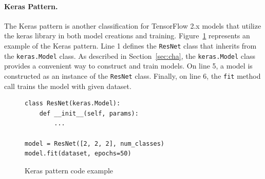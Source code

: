 


\paragraph{Keras Pattern.}
The Keras pattern is another classification for TensorFlow 2.x models that
utilize the keras library in both model creations and training. 
Figure~\ref{fig:keraspattern} represents an example of the Keras pattern.
Line 1 defines the {\tt ResNet} class that inherits from the {\tt keras.Model}
class. 
As described in Section~\ref{sec:cha}, the {\tt keras.Model} class provides a
convenient way to construct and train models. 
On line 5, a model is constructed as an instance of the {\tt ResNet} class.
Finally, on line 6, the {\tt fit} method call trains the model with given
dataset.

\vspace{-1em} 

\begin{figure}[ht!]
  \begin{lstlisting}[style=mpython]
class ResNet(keras.Model):
    def __init__(self, params):
        ...

model = ResNet([2, 2, 2], num_classes)
model.fit(dataset, epochs=50)\end{lstlisting}
 
  \caption{Keras pattern code example}
  \label{fig:keraspattern}
\end{figure}
\vspace{-1em} 

